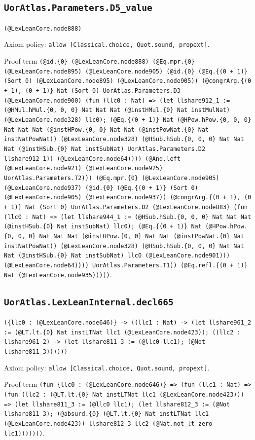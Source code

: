 \documentclass[11pt]{article}
\begin{document}
\subsection*{\texttt{UorAtlas.Parameters.D5\_value}}
\noindent\texttt{(@LexLeanCore.node888)}\par
\noindent Axiom policy: \texttt{allow [Classical.choice, Quot.sound, propext]}.\par
\noindent Proof term \texttt{(@id.\{0\} (@LexLeanCore.node888) (@Eq.mpr.\{0\} (@LexLeanCore.node895) (@LexLeanCore.node905) (@id.\{0\} (@Eq.\{(0 + 1)\} (Sort 0) (@LexLeanCore.node895) (@LexLeanCore.node905)) (@congrArg.\{(0 + 1), (0 + 1)\} Nat (Sort 0) UorAtlas.Parameters.D3 (@LexLeanCore.node900) (fun (llc0 : Nat) => (let llshare912\_1 := (@HMul.hMul.\{0, 0, 0\} Nat Nat Nat (@instHMul.\{0\} Nat instMulNat) (@LexLeanCore.node328) llc0); (@Eq.\{(0 + 1)\} Nat (@HPow.hPow.\{0, 0, 0\} Nat Nat Nat (@instHPow.\{0, 0\} Nat Nat (@instPowNat.\{0\} Nat instNatPowNat)) (@LexLeanCore.node328) (@HSub.hSub.\{0, 0, 0\} Nat Nat Nat (@instHSub.\{0\} Nat instSubNat) UorAtlas.Parameters.D2 llshare912\_1)) (@LexLeanCore.node64)))) (@And.left (@LexLeanCore.node921) (@LexLeanCore.node925) UorAtlas.Parameters.T2))) (@Eq.mpr.\{0\} (@LexLeanCore.node905) (@LexLeanCore.node937) (@id.\{0\} (@Eq.\{(0 + 1)\} (Sort 0) (@LexLeanCore.node905) (@LexLeanCore.node937)) (@congrArg.\{(0 + 1), (0 + 1)\} Nat (Sort 0) UorAtlas.Parameters.D2 (@LexLeanCore.node883) (fun (llc0 : Nat) => (let llshare944\_1 := (@HSub.hSub.\{0, 0, 0\} Nat Nat Nat (@instHSub.\{0\} Nat instSubNat) llc0); (@Eq.\{(0 + 1)\} Nat (@HPow.hPow.\{0, 0, 0\} Nat Nat Nat (@instHPow.\{0, 0\} Nat Nat (@instPowNat.\{0\} Nat instNatPowNat)) (@LexLeanCore.node328) (@HSub.hSub.\{0, 0, 0\} Nat Nat Nat (@instHSub.\{0\} Nat instSubNat) llc0 (@LexLeanCore.node901))) (@LexLeanCore.node64)))) UorAtlas.Parameters.T1)) (@Eq.refl.\{(0 + 1)\} Nat (@LexLeanCore.node935)))))}.\par
\subsection*{\texttt{UorAtlas.LexLeanInternal.decl665}}
\noindent\texttt{(\{llc0 : (@LexLeanCore.node646)\} -> ((llc1 : Nat) -> (let llshare961\_2 := (@LT.lt.\{0\} Nat instLTNat llc1 (@LexLeanCore.node423)); ((llc2 : llshare961\_2) -> (let llshare811\_3 := (@llc0 llc1); (@Not llshare811\_3))))))}\par
\noindent Axiom policy: \texttt{allow [Classical.choice, Quot.sound, propext]}.\par
\noindent Proof term \texttt{(fun \{llc0 : (@LexLeanCore.node646)\} => (fun (llc1 : Nat) => (fun (llc2 : (@LT.lt.\{0\} Nat instLTNat llc1 (@LexLeanCore.node423))) => (let llshare811\_3 := (@llc0 llc1); (let llshare812\_3 := (@Not llshare811\_3); (@absurd.\{0\} (@LT.lt.\{0\} Nat instLTNat llc1 (@LexLeanCore.node423)) llshare812\_3 llc2 (@Nat.not\_lt\_zero llc1)))))))}.\par
\end{document}
